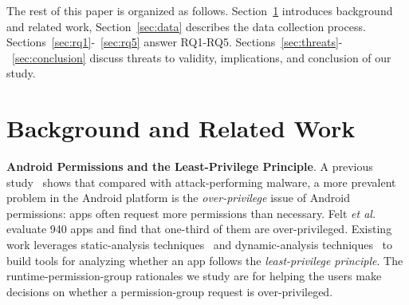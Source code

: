 






The rest of this paper is organized as follows. Section~\ref{sec:relwork} introduces background and related work, Section~\ref{sec:data} describes the data collection process. Sections~\ref{sec:rq1}-~\ref{sec:rq5} answer RQ1-RQ5. Sections~\ref{sec:threats}-~\ref{sec:conclusion} discuss threats to validity, implications, and conclusion of our study. 


\section{Background and Related Work}
\label{sec:relwork}

\textbf{Android Permissions and the Least-Privilege Principle}. A previous study~\cite{conf/ccs/FeltCHSW11} shows that compared with attack-performing malware, a more prevalent problem in the Android platform is the \emph{over-privilege} issue of Android permissions: apps often request more permissions than necessary. 
Felt \emph{et al.}~\cite{conf/soups/FeltHEHCW12} evaluate 940 apps and find that one-third of them are over-privileged. 
Existing work leverages  static-analysis techniques~\cite{conf/ccs/FeltCHSW11,conf/ccs/AuZHL12} and dynamic-analysis techniques~\cite{journals/tocs/EnckGHTCCJMS14} to build tools for analyzing whether an app follows the \emph{least-privilege principle}. 
The runtime-permission-group rationales we study are for helping the users make decisions on whether a permission-group request is over-privileged. 

